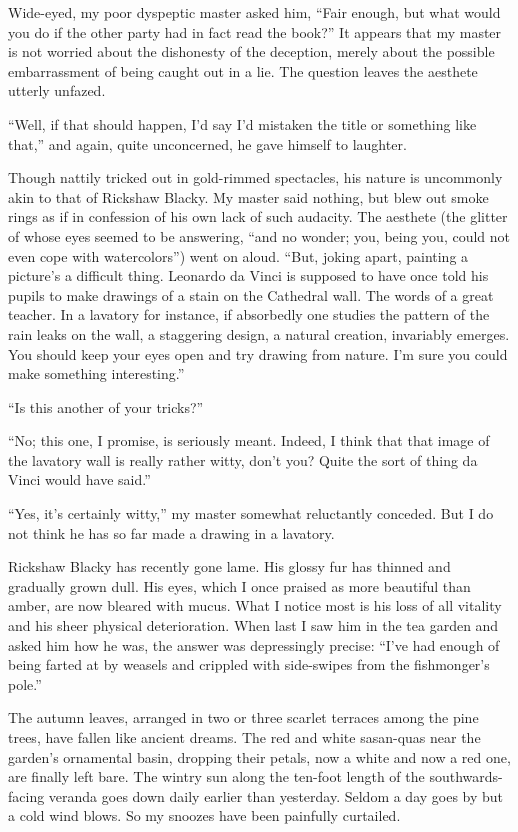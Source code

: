 \documentclass{book}
\begin{document}
Wide-eyed, my poor dyspeptic master asked him, ``Fair enough, but what
would you do if the other party had in fact read the book?'' It appears
that my master is not worried about the dishonesty of the deception,
merely about the possible embarrassment of being caught out in a lie.
The question leaves the aesthete utterly unfazed.

``Well, if that should happen, I'd say I'd mistaken the title or
something like that,'' and again, quite unconcerned, he gave himself to
laughter.

Though nattily tricked out in gold-rimmed spectacles, his nature is
uncommonly akin to that of Rickshaw Blacky. My master said nothing, but
blew out smoke rings as if in confession of his own lack of such
audacity. The aesthete (the glitter of whose eyes seemed to be
answering, ``and no wonder; you, being you, could not even cope with
watercolors'') went on aloud. ``But, joking apart, painting a picture's
a difficult thing. Leonardo da Vinci is supposed to have once told his
pupils to make drawings of a stain on the Cathedral wall. The words of a
great teacher. In a lavatory for instance, if absorbedly one studies the
pattern of the rain leaks on the wall, a staggering design, a natural
creation, invariably emerges. You should keep your eyes open and try
drawing from nature. I'm sure you could make something interesting.''

``Is this another of your tricks?''

``No; this one, I promise, is seriously meant. Indeed, I think that that
image of the lavatory wall is really rather witty, don't you? Quite the
sort of thing da Vinci would have said.''

``Yes, it's certainly witty,'' my master somewhat reluctantly conceded.
But I do not think he has so far made a drawing in a lavatory.

Rickshaw Blacky has recently gone lame. His glossy fur has thinned and
gradually grown dull. His eyes, which I once praised as more beautiful
than amber, are now bleared with mucus. What I notice most is his loss
of all vitality and his sheer physical deterioration. When last I saw
him in the tea garden and asked him how he was, the answer was
depressingly precise: ``I've had enough of being farted at by weasels
and crippled with side-swipes from the fishmonger's pole.''

The autumn leaves, arranged in two or three scarlet terraces among the
pine trees, have fallen like ancient dreams. The red and white
sasan-quas near the garden's ornamental basin, dropping their petals,
now a white and now a red one, are finally left bare. The wintry sun
along the ten-foot length of the southwards-facing veranda goes down
daily earlier than yesterday. Seldom a day goes by but a cold wind
blows. So my snoozes have been painfully curtailed.
\end{document}

